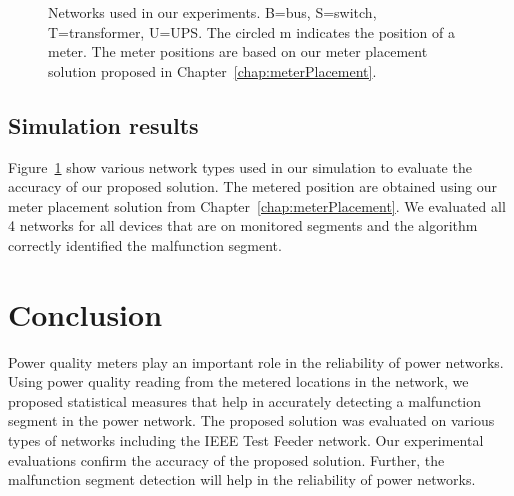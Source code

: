 \begin{figure}[!t]
\centering
{}

\begin{centering}
\end{centering}

\begin{centering}
\end{centering}

\begin{centering}
\end{centering}

\caption{Networks used in our experiments. B=bus, S=switch, T=transformer,
U=UPS. The circled m indicates the position of a meter. The meter positions are based on our meter placement solution proposed in Chapter~\ref{chap:meterPlacement}.} 
\label{mf_networks_used}
\end{figure}

\subsection{Simulation results}
Figure~\ref{mf_networks_used} show various network types used in our simulation to evaluate the accuracy of our proposed solution. The metered position are obtained using our meter placement solution from Chapter~\ref{chap:meterPlacement}. We evaluated all 4 networks for all devices that are on monitored segments and the algorithm correctly identified the malfunction segment.

\section{Conclusion}
Power quality meters play an important role in the reliability of power networks. Using power quality reading from the metered locations in the network, we proposed statistical measures that help in accurately detecting a malfunction segment in the power network. The proposed solution was evaluated on various types of networks including the IEEE Test Feeder network. Our experimental evaluations confirm the accuracy of the proposed solution. Further, the malfunction segment detection will help in the reliability of power networks.